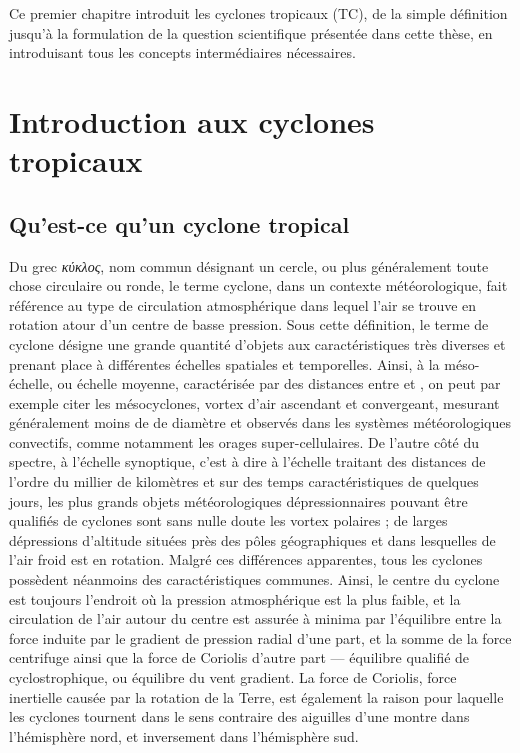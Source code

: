 \documentclass[../main.tex]{subfiles}
\begin{document}
\begin{itshape}
Ce premier chapitre introduit les cyclones tropicaux (TC), de la simple définition jusqu'à la formulation de la question scientifique présentée dans cette thèse, en introduisant tous les concepts intermédiaires nécessaires.
\end{itshape}

\minitoc
\section{Introduction aux cyclones tropicaux}

\subsection{Qu'est-ce qu'un cyclone tropical}\label{sec:quest_ce_qu_un_cyclone}

Du grec \textit{κύκλος}, nom commun désignant un cercle, ou plus généralement toute chose circulaire ou ronde, le terme cyclone, dans un contexte
météorologique, fait référence au type de circulation atmosphérique dans lequel l'air se trouve en rotation atour d'un centre de basse pression. Sous cette
définition, le terme de cyclone désigne une grande quantité d'objets aux caractéristiques très diverses et prenant place à différentes échelles spatiales et
temporelles. Ainsi, à la méso-échelle, ou échelle moyenne, caractérisée par des distances entre  et , on peut par exemple citer les mésocyclones,
vortex d'air ascendant et convergeant, mesurant généralement moins de  de diamètre et observés dans les systèmes météorologiques convectifs, comme
notamment les orages super-cellulaires. De l'autre côté du spectre, à l'échelle synoptique, c'est à dire à l'échelle traitant des distances de l'ordre du
millier de kilomètres et sur des temps caractéristiques de quelques jours, les plus grands objets météorologiques dépressionnaires pouvant être qualifiés de
cyclones sont sans nulle doute les vortex polaires ; de larges dépressions d'altitude situées près des pôles géographiques et dans lesquelles de l'air froid est
en rotation. Malgré ces différences apparentes, tous les cyclones possèdent néanmoins des caractéristiques communes. Ainsi, le centre du cyclone est toujours
l'endroit où la pression atmosphérique est la plus faible, et la circulation de l'air autour du centre est assurée à minima par l'équilibre entre la force
induite par le gradient de pression radial d'une part, et la somme de la force centrifuge ainsi que la force de Coriolis d'autre part --- équilibre qualifié de
cyclostrophique, ou équilibre du vent gradient. La force de Coriolis, force inertielle causée par la rotation de la Terre, est également la raison pour laquelle
les cyclones tournent dans le sens contraire des aiguilles d'une montre dans l'hémisphère nord, et inversement dans l'hémisphère sud.
\end{document}

